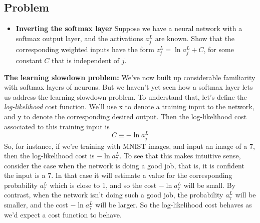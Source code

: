 \documentclass[a4paper,twoside,10pt]{book}
\begin{document}
\subsection*{Problem}
\begin{itemize}
	\item \textbf{Inverting the softmax layer} Suppose we have a neural network with a softmax output layer, and the activations $a^L_j$ are known. Show that the corresponding weighted inputs have the form $z^L_j=\ln a^L_j+C$, for some constant $C$ that is independent of $j$.
\end{itemize}
\textbf{The learning slowdown problem:} We've now built up considerable familiarity with softmax layers of neurons. But we haven't yet seen how a softmax layer lets us address the learning slowdown problem. To understand that, let's define the \textit{log-likelihood} cost function. We'll use x to denote a training input to the network, and y to denote the corresponding desired output. Then the log-likelihood cost associated to this training input is
\begin{equation}
	C \equiv -\ln a^L_j
\label{eq:80}
\end{equation}
So, for instance, if we're training with MNIST images, and input an image of a 7, then the log-likelihood cost is $-\ln a^L_7$. To see that this makes intuitive sense, consider the case when the network is doing a good job, that is, it is confident the input is a 7. In that case it will estimate a value for the corresponding probability $a^L_7$ which is close to 1, and so the cost $-\ln a^L_7$ will be small. By contrast, when the network isn't doing such a good job, the probability $a^L_7$ will be smaller, and the cost $-\ln a^L_7$ will be larger. So the log-likelihood cost behaves as we'd expect a cost function to behave.
\end{document}
